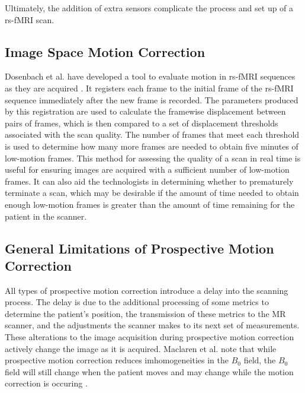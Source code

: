 


Ultimately, the addition of extra sensors complicate the process and set up of a rs-fMRI scan.

\subsection{Image Space Motion Correction}

Dosenbach et al. have developed a tool to evaluate motion in rs-fMRI sequences as they are acquired \cite{Dosenbach2017}. It registers each frame to the initial frame of the rs-fMRI sequence immediately after the new frame is recorded. The parameters produced by this registration are used to calculate the framewise displacement between pairs of frames, which is then compared to a set of displacement thresholds associated with the scan quality. The number of frames that meet each threshold is used to determine how many more frames are needed to obtain five minutes of low-motion frames. This method for assessing the quality of a scan in real time is useful for ensuring images are acquired with a sufficient number of low-motion frames. It can also aid the technologists in determining whether to prematurely terminate a scan, which may be desirable if the amount of time needed to obtain enough low-motion frames is greater than the amount of time remaining for the patient in the scanner. 


\subsection{General Limitations of Prospective Motion Correction}

All types of prospective motion correction introduce a delay into the scanning process. The delay is due to the additional processing of some metrics to determine the patient's position, the transmission of these metrics to the MR scanner, and the adjustments the scanner makes to its next set of measurements. These alterations to the image acquisition during prospective motion correction actively change the image as it is acquired.
Maclaren et al. note that while prospective motion correction reduces imhomogeneities in the $B_0$ field, the $B_0$ field will still change when the patient moves and may change while the motion correction is occuring \cite{Maclaren2013}. %

